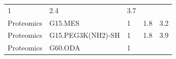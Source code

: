 \documentclass[utf8]{frontiersHLTH} %
\begin{document}
\begin{longtable}[]{@{}lllll@{}}
\begin{minipage}[t]{0.06\columnwidth}
1\strut
\end{minipage} & \begin{minipage}[t]{0.15\columnwidth}\raggedright\strut
2.4\strut
\end{minipage} & \begin{minipage}[t]{0.08\columnwidth}\raggedright\strut
3.7\strut
\end{minipage}\tabularnewline
\begin{minipage}[t]{0.26\columnwidth}\raggedright\strut
Proteomics\strut
\end{minipage} & \begin{minipage}[t]{0.21\columnwidth}\raggedright\strut
G15.MES\strut
\end{minipage} & \begin{minipage}[t]{0.06\columnwidth}\raggedright\strut
1\strut
\end{minipage} & \begin{minipage}[t]{0.15\columnwidth}\raggedright\strut
1.8\strut
\end{minipage} & \begin{minipage}[t]{0.08\columnwidth}\raggedright\strut
3.2\strut
\end{minipage}\tabularnewline
\begin{minipage}[t]{0.26\columnwidth}\raggedright\strut
Proteomics\strut
\end{minipage} & \begin{minipage}[t]{0.21\columnwidth}\raggedright\strut
G15.PEG3K(NH2)-SH\strut
\end{minipage} & \begin{minipage}[t]{0.06\columnwidth}\raggedright\strut
1\strut
\end{minipage} & \begin{minipage}[t]{0.15\columnwidth}\raggedright\strut
1.8\strut
\end{minipage} & \begin{minipage}[t]{0.08\columnwidth}\raggedright\strut
3.9\strut
\end{minipage}\tabularnewline
\begin{minipage}[t]{0.26\columnwidth}\raggedright\strut
Proteomics\strut
\end{minipage} & \begin{minipage}[t]{0.21\columnwidth}\raggedright\strut
G60.ODA\strut
\end{minipage} & \begin{minipage}[t]{0.06\columnwidth}\raggedright\strut
1\strut
\end{minipage} & \begin{minipage}[t]{0.15\columnwidth}\raggedright\strut

\end{minipage}
\end{longtable}
\end{document}
